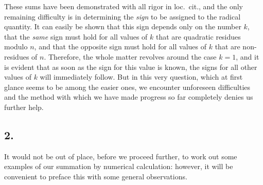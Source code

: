 \documentclass[twoside,12pt]{memoir}
\begin{document}
These sums have been demonstrated with all rigor in {loc.\ cit.}, and the only remaining difficulty is in determining the \textit{sign} to be assigned to the radical quantity. It can easily be shown that this sign depends only on the number \(k\), that the \textit{same} sign must hold for all values of \(k\) that are quadratic residues modulo \(n\), and that the opposite sign must hold for all values of \(k\) that are non-residues of \(n\). Therefore, the whole matter revolves around the case \(k=1\), and it is evident that as soon as the sign for this value is known, the signs for all other values of \(k\) will immediately follow. But in this very question, which at first glance seems to be among the easier ones, we encounter unforeseen difficulties and the method with which we have made progress so far completely denies us further help.

\subsection*{2.}
 
It would not be out of place, before we proceed further, to work out some examples of our summation by numerical calculation: however, it will be convenient to preface this with some general observations.\\
\end{document}
